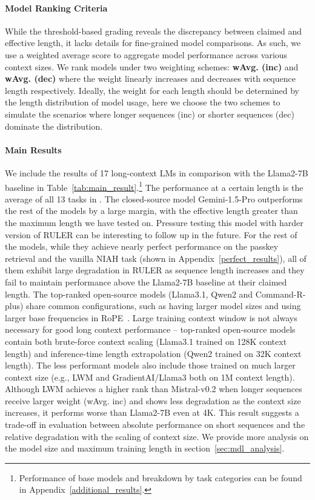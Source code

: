 \paragraph{Model Ranking Criteria}  While the threshold-based grading reveals the discrepancy between claimed and effective length, it lacks details for fine-grained model comparisons. As such, we use a weighted average score to aggregate model performance across various context sizes. We rank models under two weighting schemes: \textbf{wAvg. (inc)} and \textbf{wAvg. (dec)} where the weight linearly increases and decreases with sequence length respectively. Ideally, the weight for each length should be determined by the length distribution of model usage, here we choose the two schemes to simulate the scenarios where longer sequences (inc) or shorter sequences (dec) dominate the distribution. 

% 
% 


\paragraph{Main Results}
We include the results of 17 long-context LMs in comparison with the Llama2-7B baseline in Table~\ref{tab:main_result}.\footnote{Performance of base models and breakdown by task categories can be found in Appendix~\ref{additional_results}.} 
The performance at a certain length is the average of all 13 tasks in .
The closed-source model Gemini-1.5-Pro outperforms the rest of the models by a large margin, with the effective length greater than the maximum length we have tested on. Pressure testing this model with harder version of RULER can be interesting to follow up in the future. For the rest of the models, while they achieve nearly perfect performance on the passkey retrieval and the vanilla NIAH task (shown in Appendix~\ref{perfect_results}), all of them exhibit large degradation in RULER as sequence length increases and they fail to maintain performance above the Llama2-7B baseline at their claimed length.
The top-ranked open-source models (Llama3.1, Qwen2 and Command-R-plus) share common configurations, such as having larger model sizes and using larger base frequencies in RoPE~\citep{abf}. Large training context window is not always necessary for good long context performance -- top-ranked open-source models contain both brute-force context scaling (Llama3.1 trained on 128K context length) and inference-time length extrapolation (Qwen2 trained on 32K context length). The less performant models also include those trained on much larger context size (e.g., LWM and GradientAI/Llama3 both on 1M context length). Although LWM achieves a higher rank than Mistral-v0.2 when longer sequences receive larger weight (wAvg. inc) and shows less degradation as the context size increases, it performs worse than Llama2-7B even at 4K. This result suggests a trade-off in evaluation between absolute performance on short sequences and the relative degradation with the scaling of context size. We provide more analysis on the model size and maximum training length in section~\ref{sec:mdl_analysis}.

